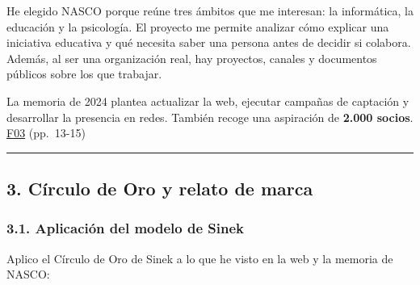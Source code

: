 \documentclass[
]{article}
\begin{document}
He elegido NASCO porque reúne tres ámbitos que me interesan: la
informática, la educación y la psicología. El proyecto me permite
analizar cómo explicar una iniciativa educativa y qué necesita saber una
persona antes de decidir si colabora. Además, al ser una organización
real, hay proyectos, canales y documentos públicos sobre los que
trabajar.

La memoria de 2024 plantea actualizar la web, ejecutar campañas de
captación y desarrollar la presencia en redes. También recoge una
aspiración de \textbf{2.000 socios}.
\href{https://nascoict.org/wp-content/uploads/MEMORIA-2024.pdf}{F03}
(pp.~13-15)

\begin{center}\rule{0.5\linewidth}{0.5pt}\end{center}

\hypertarget{cuxedrculo-de-oro-y-relato-de-marca}{%
\subsection{3. Círculo de Oro y relato de
marca}\label{cuxedrculo-de-oro-y-relato-de-marca}}

\hypertarget{aplicaciuxf3n-del-modelo-de-sinek}{%
\subsubsection{3.1. Aplicación del modelo de
Sinek}\label{aplicaciuxf3n-del-modelo-de-sinek}}

Aplico el Círculo de Oro de Sinek a lo que he visto en la web y la
memoria de NASCO:
\end{document}
